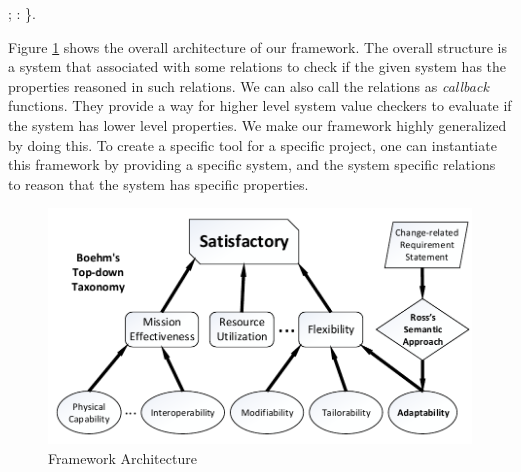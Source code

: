 \documentclass[conference]{IEEEtran}
\begin{document}
\begin{coqdoccode}
\coqdoceol
\coqdocnoindent
; :              \coqdoceol
\coqdocnoindent
\}.\coqdoceol
\end{coqdoccode}

Figure \ref{fig:arch} shows the overall architecture of our framework. The overall structure is a system that associated with some relations to check if the given system has the properties reasoned in such relations. We can also call the relations as {\em callback} functions. They provide a way for higher level system value checkers to evaluate if the system has lower level properties. We make our framework highly generalized by doing this. To create a specific tool for a specific project, one can instantiate this framework by providing a specific system, and the system specific relations to reason that the system has specific properties.

\begin{figure}[ht]
	\centering
	\includegraphics[scale=0.6]{img/architecture.pdf}
	\caption{Framework Architecture}
    \label{fig:arch}
\end{figure}
\end{document}
